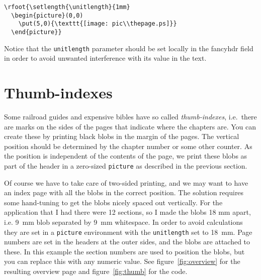 \documentclass[a4paper]{article}
\newcommand{\bs}{\symbol{'134}}
\newcommand{\Cmd}[1]{\texttt{\def\{{\char`\{}\def\}{\char`\}}\bs#1}}
\begin{document}
\begin{verbatim}
\rfoot{\setlength{\unitlength}{1mm}
  \begin{picture}(0,0)
    \put(5,0){\texttt{[image: pic\\thepage.ps]}}
  \end{picture}}
\end{verbatim}

Notice that the \Cmd{unitlength} parameter should
be set locally in the fancyhdr field in order to avoid unwanted
interference with its value in the text.

\section{Thumb-indexes}
\label{sec:thumb}

Some railroad guides and expensive bibles have so called
\emph{thumb-indexes}, i.e.\ there are marks on the sides of the pages that
indicate where the chapters are. You can create these by printing black
blobs in the margin of the pages. The vertical position should be
determined by the chapter number or some other counter. As the position is
independent of the contents of the page, we print these blobs as part of
the header in a zero-sized \texttt{picture} as described in the previous
section.

Of course we have to take care of two-sided printing, and we may want to
have an index page with all the blobs in the correct position. The solution
requires some hand-tuning to get the blobs nicely spaced out vertically.
For the application that I had there were 12 sections, so I made the blobs
18 mm apart, i.e. 9~mm blob separated by 9~mm whitespace. In order to avoid
calculations they are set in a \texttt{picture} environment with the
\Cmd{unitlength} set to 18~mm. Page numbers are set in the headers at the
outer sides, and the blobs are attached to these. In this example the
section numbers are used to position the blobs, but you can replace this
with any numeric value.
See figure~\ref{fig:overview} for the resulting
overview page and figure~\ref{fig:thumb} for the code.
\end{document}
